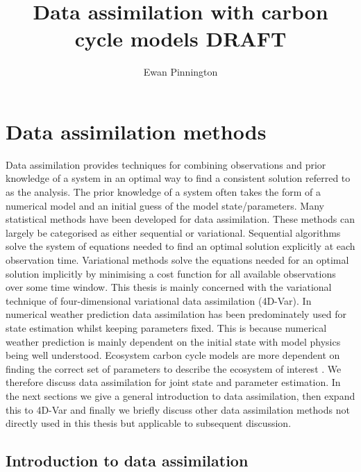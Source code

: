 \documentclass[12pt]{article}
\title{Data assimilation with carbon cycle models {\color{red} DRAFT}}
\author{Ewan Pinnington}
\begin{document}
\maketitle



\section{Data assimilation methods}

Data assimilation provides techniques for combining observations and prior knowledge of a system in an optimal way to find a consistent solution referred to as the analysis. The prior knowledge of a system often takes the form of a numerical model and an initial guess of the model state/parameters. Many statistical methods have been developed for data assimilation. These methods can largely be categorised as either sequential or variational. Sequential algorithms solve the system of equations needed to find an optimal solution explicitly at each observation time. Variational methods solve the equations needed for an optimal solution implicitly by minimising a cost function for all available observations over some time window. This thesis is mainly concerned with the variational technique of four-dimensional variational data assimilation (4D-Var). In numerical weather prediction data assimilation has been predominately used for state estimation whilst keeping parameters fixed. This is because numerical weather prediction is mainly dependent on the initial state with model physics being well understood. Ecosystem carbon cycle models are more dependent on finding the correct set of parameters to describe the ecosystem of interest \citep{luo2015predictability}. We therefore discuss data assimilation for joint state and parameter estimation. In the next sections we give a general introduction to data assimilation, then expand this to 4D-Var and finally we briefly discuss other data assimilation methods not directly used in this thesis but applicable to subsequent discussion. 

\subsection{Introduction to data assimilation}
\end{document}
